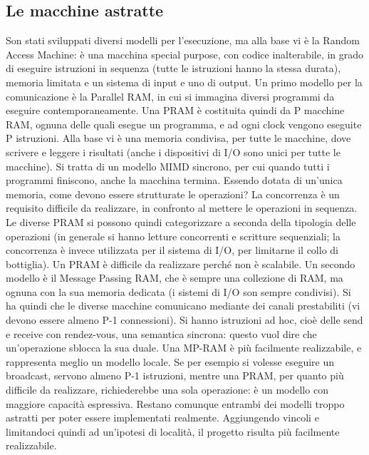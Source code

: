 \subsection{Le macchine astratte}
Son stati sviluppati diversi modelli per l'esecuzione, ma alla base vi è la Random Access Machine: è una macchina
special purpose, con codice inalterabile, in grado di eseguire istruzioni in sequenza (tutte le istruzioni hanno la
stessa durata), memoria limitata e un sistema di input e uno di output.
Un primo modello per la comunicazione è la Parallel RAM, in cui si immagina diversi programmi da eseguire
contemporaneamente. Una PRAM è costituita quindi da P macchine RAM, ognuna delle quali esegue un programma, e ad ogni
clock vengono eseguite P istruzioni. Alla base vi è una memoria condivisa, per tutte le macchine, dove scrivere e
leggere i risultati (anche i dispositivi di I/O sono unici per tutte le macchine). Si tratta di un modello MIMD
sincrono, per cui quando tutti i programmi finiscono, anche la macchina termina. Essendo dotata di un'unica memoria,
come devono essere strutturate le operazioni? La concorrenza è un requisito difficile da realizzare, in confronto al
mettere le operazioni in sequenza. Le diverse PRAM si possono quindi categorizzare a seconda della tipologia delle
operazioni (in generale si hanno letture concorrenti e scritture sequenziali; la concorrenza è invece utilizzata per 
il sistema di I/O, per limitarne il collo di bottiglia). Un PRAM è difficile da realizzare perché non è scalabile.
Un secondo modello è il Message Passing RAM, che è sempre una collezione di RAM, ma ognuna con la sua memoria dedicata
(i sistemi di I/O son sempre condivisi). Si ha quindi che le diverse macchine comunicano mediante dei canali
prestabiliti (vi devono essere almeno P-1 connessioni). Si hanno istruzioni ad hoc, cioè delle send e receive con
rendez-vous, una semantica sincrona: questo vuol dire che un'operazione sblocca la sua duale. Una MP-RAM è più
facilmente realizzabile, e rappresenta meglio un modello locale. Se per esempio si volesse eseguire un broadcast,
servono almeno P-1 istruzioni, mentre una PRAM, per quanto più difficile da realizzare, richiederebbe una sola
operazione: è un modello con maggiore capacità espressiva. Restano comunque entrambi dei modelli troppo astratti per
poter essere implementati realmente. Aggiungendo vincoli e limitandoci quindi ad un'ipotesi di località, il progetto
risulta più facilmente realizzabile.
